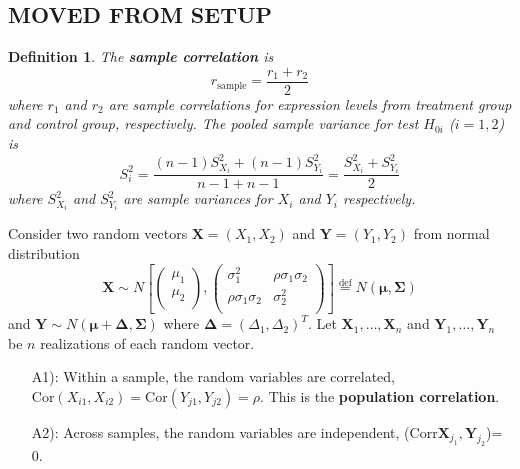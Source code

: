 \documentclass[12pt, a4paper]{article}
\newtheorem{definition}{Definition}     %
\newcommand{\cor}{\text{Corr}}
\begin{document}
\begin{appendix}
		
		
		\section{MOVED FROM SETUP}
		
		
			\begin{definition}
				The \textbf{sample correlation} is 
				\begin{equation}\label{rhosample}
				r_{\text{sample}}  = \frac{r_1 + r_2}{2}
				\end{equation}
				where $r_1$  and $r_2$ are sample correlations for expression levels from treatment group and control group, respectively.
				The pooled sample variance for test $H_{0i}$ ($i=1, 2$) is 
				\begin{equation}\label{pooledvariance}
				S_i^2 = \frac{(n-1)S_{X_i}^2 + (n-1)S_{Y_i}^2}{n-1 + n-1} = \frac{S_{X_i}^2 + S_{Y_i}^2}{2}
				\end{equation}
				where $S_{X_i}^2$ and $S_{Y_i}^2$ are sample variances for $X_i$ and $Y_i$ respectively.
			\end{definition} 
			
			
			
			
			Consider two random vectors $\bm X = (X_1, X_2)$ and $\bm Y =  (Y_1, Y_2)$ from normal distribution
			\[ \bm X 
			\sim N\left[
			\left(\begin{array}{c}
			\mu_1\\
			\mu_2\\
			\end{array} \right), 
			\left(
			\begin{array}{cc}
			\sigma_1^2 &\rho \sigma_1\sigma_2 \\
			\rho \sigma_1 \sigma_2 & 	\sigma_2^2 \\
			\end{array}
			\right)
			\right]  \stackrel{\text{def}}{=} N(\bm \mu, \bm \Sigma)
			\] 
			and $\bm Y \sim N(\bm \mu + \bm \Delta, \bm \Sigma)$ where $\bm \Delta = (\Delta_1, \Delta_2)^T$.
			Let $\bm X_1, \ldots, \bm X_n$ and $\bm Y_1, \ldots, \bm Y_n$ be $n$ realizations of each random
			vector. 
			\begin{enumerate}
				\item[A1):] Within a sample, the random variables are correlated, $\text{Cor}(X_{i1}, X_{i2}) =
				\text{Cor}(Y_{j1}, Y_{j2}) = \rho$.  This is the \textbf{population correlation}.
				\item[A2):] Across samples, the random variables are independent, ($\cor\bm X_{j_1}, \bm Y_{j_2}$)=
				0. 
			\end{enumerate} 
			

\end{appendix}
\end{document}
